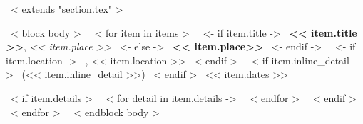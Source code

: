 ~< extends "section.tex" >~

~< block body >~
~< for item in items >~
    ~<- if item.title ->~
    \textbf{<< item.title >>}, \emph{<< item.place >>}
    ~<- else ->~
    \textbf{<< item.place>>}
    ~<- endif ->~
    ~<- if item.location ->~
    , << item.location >>
    ~< endif >~
    ~< if item.inline_detail >~
    {\footnotesize \color{gray} (<< item.inline_detail >>)}
    ~< endif >~
    \hfill << item.dates >> \par
    ~< if item.details >~
        ~< for detail in item.details ->~
        ~< endfor >~
    ~< endif >~
    \vspace{3mm}
~< endfor >~
\vspace{5mm}
~< endblock body >~